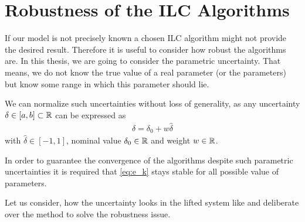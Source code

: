 \chapter{Robustness of the ILC Algorithms}
If our model is not precisely known a chosen ILC algorithm might not provide the desired result. 
Therefore it is useful to consider how robust the algorithms are. 
In this thesis, we are going to consider the parametric uncertainty. That means, we do not know the true value of a real parameter (or the parameters) but know some range in which this parameter should lie. 

We can normalize such uncertainties without loss of generality, as any uncertainty $\delta \in [a,b] \subset {\mathbb{R}}$ can be expressed as 
\begin{align}
\label{eq:rob:del=del0+...}
\delta = \delta_0 + w \hat{\delta}
\end{align}
with $\hat{\delta} \in [-1,1]$, nominal value $\delta_0 \in {\mathbb{R}}$ and weight $w\in {\mathbb{R}}$. 

%

In order to guarantee the convergence of the algorithms despite such parametric uncertainties it is required that \eqref{eq:e_k}  stays stable for all possible value of parameters.

Let us consider, how the uncertainty looks in the lifted system like and deliberate over the method to solve the robustness issue. 





